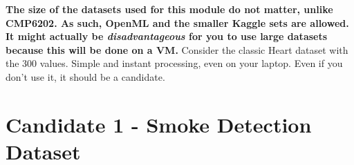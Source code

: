 \documentclass[12pt]{report}
\begin{document}
\noindent \large \textbf{
The size of the datasets used for this module do not matter, unlike CMP6202.
As such, OpenML and the smaller Kaggle sets are allowed. It might actually be 
\textit{disadvantageous} for you to use large datasets because this will be done on a VM.} 
Consider the classic Heart dataset with the 300 values. Simple and instant processing, 
even on your laptop. Even if you don't use it, it should be a candidate. 

\section{Candidate 1 - Smoke Detection Dataset}
\end{document}
